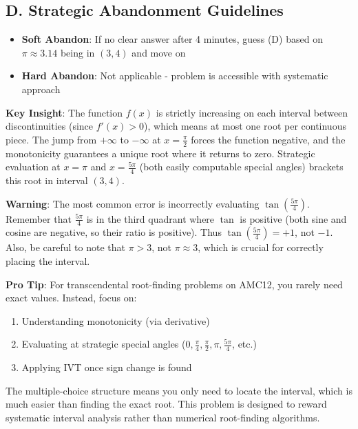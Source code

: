 \documentclass[]{article}
\begin{document}
\begin{competitionbox}
\subsection*{D. Strategic Abandonment Guidelines}
\begin{itemize}[leftmargin=*]
    \item \textbf{Soft Abandon}: If no clear answer after 4 minutes, guess (D) based on $\pi \approx 3.14$ being in $(3,4)$ and move on
    \item \textbf{Hard Abandon}: Not applicable - problem is accessible with systematic approach
\end{itemize}
\end{competitionbox}

\begin{keyinsightbox}
\textbf{Key Insight}: The function $f(x)$ is strictly increasing on each interval between discontinuities (since $f'(x) > 0$), which means at most one root per continuous piece. The jump from $+\infty$ to $-\infty$ at $x = \frac{\pi}{2}$ forces the function negative, and the monotonicity guarantees a unique root where it returns to zero. Strategic evaluation at $x = \pi$ and $x = \frac{5\pi}{4}$ (both easily computable special angles) brackets this root in interval $(3,4)$.
\end{keyinsightbox}

\begin{warningbox}
\textbf{Warning}: The most common error is incorrectly evaluating $\tan(\frac{5\pi}{4})$. Remember that $\frac{5\pi}{4}$ is in the third quadrant where $\tan$ is positive (both sine and cosine are negative, so their ratio is positive). Thus $\tan(\frac{5\pi}{4}) = +1$, not $-1$. Also, be careful to note that $\pi > 3$, not $\pi \approx 3$, which is crucial for correctly placing the interval.
\end{warningbox}

\begin{tipbox}
\textbf{Pro Tip}: For transcendental root-finding problems on AMC12, you rarely need exact values. Instead, focus on:
\begin{enumerate}
    \item Understanding monotonicity (via derivative)
    \item Evaluating at strategic special angles ($0, \frac{\pi}{4}, \frac{\pi}{2}, \pi, \frac{5\pi}{4}$, etc.)
    \item Applying IVT once sign change is found
\end{enumerate}
The multiple-choice structure means you only need to locate the interval, which is much easier than finding the exact root. This problem is designed to reward systematic interval analysis rather than numerical root-finding algorithms.
\end{tipbox}
\end{document}
